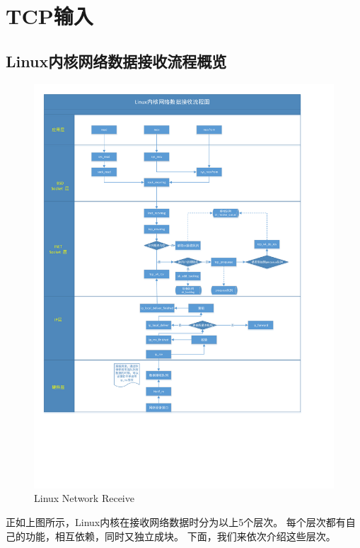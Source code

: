 \chapter{TCP输入}
\label{chapter:tcp_input}

	\minitoc

	\section{Linux内核网络数据接收流程概览}
        \begin{figure}[htb]        
            \centering
            \includegraphics[width=\textwidth]  {images/Linux Network Receive.pdf}
			\caption{Linux Network Receive}
        \end{figure}    
		正如上图所示，Linux内核在接收网络数据时分为以上5个层次。
		每个层次都有自己的功能，相互依赖，同时又独立成块。
		下面，我们来依次介绍这些层次。
